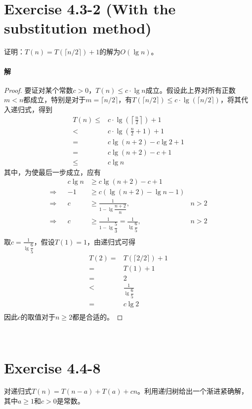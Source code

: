 \documentclass{article}
\begin{document}
\section{Exercise 4.3-2 (With the substitution method) }
证明：$T(n)=T(\lceil n/2 \rceil)+1$的解为$O(\lg{n})$。
\\

\paragraph{解}
\begin{proof}
要证对某个常数$c > 0$，$T(n) \leq c \cdot \lg{n}$成立。假设此上界对所有正数$m < n$都成立，特别是对于$m = \lceil n/2 \rceil$，有$T(\lceil n/2 \rceil) \leq c \cdot \lg{(\lceil n/2 \rceil)}$，将其代入递归式，得到
\begin{align*}
    T(n) \leq & c \cdot \lg{\left(\left\lceil \frac{n}{2} \right\rceil \right)} + 1 \\
    < & c \cdot \lg{\left( \frac{n}{2} + 1 \right)} + 1 \\
    =& c \lg{( n + 2 )} - c \lg{2} + 1 \\
    =& c \lg{( n + 2 )} - c + 1 \\
    \leq & c \lg{n} 
\end{align*}
其中，为使最后一步成立，应有
\begin{align*}
    && c \lg{n} &\geq c \lg{(n + 2)} - c + 1 & \\
    \Rightarrow && -1 &\geq c \left(\lg{(n + 2)} - \lg{n} - 1 \right) & \\
    \Rightarrow && c &\geq \frac{1}{1 - \lg{\dfrac{n + 2}{n} }}, & n > 2 \\
    \Rightarrow && c &\geq \frac{1}{1 - \lg{\dfrac{5}{3}}} = \frac{1}{\lg{\dfrac{6}{5}}}, &  n > 2 \\
\end{align*}
取$c = \displaystyle \frac{1}{\lg{\dfrac{6}{5}}}$，假设$T(1) = 1$，由递归式可得
\begin{align*}
    T(2) =& T(\lceil 2/2 \rceil) + 1 \\
    =& T(1) + 1 \\
    =& 2 \\
    <& \frac{1}{\lg{\dfrac{6}{5}}} \\
    =& c \lg{2} \\
\end{align*}
因此$c$的取值对于$n \geq 2$都是合适的。
\end{proof}
\\

\section{Exercise 4.4-8}
对递归式$T(n)=T(n-a)+T(a)+cn$。利用递归树给出一个渐进紧确解，其中$a \geq 1$和$c>0$是常数。
\\
\end{document}
